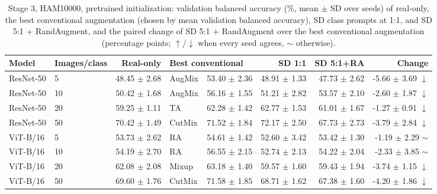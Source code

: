 \begin{table}[H]
\centering
\small
\setlength{\tabcolsep}{4pt}
\caption{Stage 3, HAM10000, pretrained initialization: validation balanced accuracy (\%, mean $\pm$ SD over seeds) of real-only, the best conventional augmentation (chosen by mean validation balanced accuracy), SD class prompts at 1:1, and SD 5:1 + RandAugment, and the paired change of SD 5:1 + RandAugment over the best conventional augmentation (percentage points; $\uparrow$/$\downarrow$ when every seed agrees, $\sim$ otherwise).}
\label{tab:stage3-ham10000-scores-pretrained}
\begin{tabular}{llrlrrrr}
\toprule
Model & Images/class & Real-only & \multicolumn{2}{l}{Best conventional} & SD 1:1 & SD 5:1+RA & Change \\
\midrule
ResNet-50 & 5 & 48.45 $\pm$ 2.68 & AugMix & 53.40 $\pm$ 2.36 & 48.91 $\pm$ 1.33 & 47.73 $\pm$ 2.62 & -5.66 $\pm$ 3.69 $\downarrow$ \\
ResNet-50 & 10 & 50.42 $\pm$ 1.68 & AugMix & 56.16 $\pm$ 1.55 & 51.21 $\pm$ 2.82 & 53.57 $\pm$ 2.10 & -2.60 $\pm$ 1.87 $\downarrow$ \\
ResNet-50 & 20 & 59.25 $\pm$ 1.11 & TA & 62.28 $\pm$ 1.42 & 62.77 $\pm$ 1.53 & 61.01 $\pm$ 1.67 & -1.27 $\pm$ 0.91 $\downarrow$ \\
ResNet-50 & 50 & 70.42 $\pm$ 1.49 & CutMix & 71.52 $\pm$ 1.84 & 72.17 $\pm$ 2.50 & 67.73 $\pm$ 2.73 & -3.79 $\pm$ 2.84 $\downarrow$ \\
ViT-B/16 & 5 & 53.73 $\pm$ 2.62 & RA & 54.61 $\pm$ 1.42 & 52.60 $\pm$ 3.42 & 53.42 $\pm$ 1.30 & -1.19 $\pm$ 2.29 $\sim$ \\
ViT-B/16 & 10 & 54.19 $\pm$ 2.70 & RA & 56.55 $\pm$ 2.15 & 52.74 $\pm$ 2.13 & 54.22 $\pm$ 2.04 & -2.33 $\pm$ 3.85 $\sim$ \\
ViT-B/16 & 20 & 62.08 $\pm$ 2.08 & Mixup & 63.18 $\pm$ 1.40 & 59.57 $\pm$ 1.60 & 59.43 $\pm$ 1.94 & -3.74 $\pm$ 1.15 $\downarrow$ \\
ViT-B/16 & 50 & 69.60 $\pm$ 1.76 & CutMix & 71.58 $\pm$ 1.85 & 68.71 $\pm$ 1.62 & 67.38 $\pm$ 1.60 & -4.20 $\pm$ 1.86 $\downarrow$ \\
\bottomrule
\end{tabular}
\end{table}
